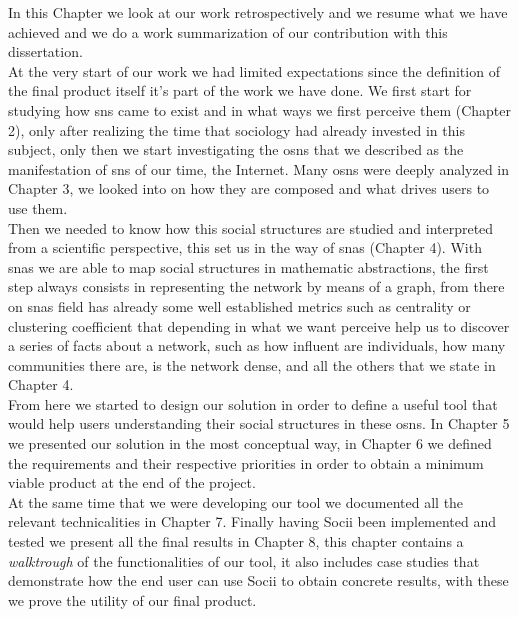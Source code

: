 In this Chapter we look at our work retrospectively and we resume what we have achieved and we do a work summarization of our contribution with this
dissertation.\\
\indent At the very start of our work we had limited expectations since the definition of the final product itself it's part of the work we have done. We first start for studying how \glspl{sn} came to exist and in what ways we first perceive them (Chapter 2), only after realizing the time that sociology had already invested in this subject, only then we start investigating the \glspl{osn} that we described as the manifestation of \glspl{sn} of our time, the Internet. Many \glspl{osn} were deeply analyzed in Chapter 3, we looked into on how they are composed and what drives users to use them.\\
\indent Then we needed to know how this social structures are studied and interpreted from a scientific perspective, this set us in the way of \glspl{sna} (Chapter 4). With \glspl{sna} we are able to map social structures in mathematic abstractions, the first step always consists in representing the network by means of a graph, from there on \glspl{sna} field has already some well established metrics such as centrality or clustering coefficient that depending in what we want perceive help us to discover a series of facts about a network, such as how influent are individuals, how many communities there are, is the network dense, and all the others that we state in Chapter 4.\\
\indent From here we started to design our solution in order to define a useful tool that would help users understanding their social structures in these \glspl{osn}. In Chapter 5 we presented our solution in the most conceptual way, in Chapter 6 we defined the requirements and their respective priorities in order to obtain a minimum viable product at the end of the project.\\
\indent At the same time that we were developing our tool we documented all the relevant technicalities in Chapter 7. Finally having Socii been implemented and tested we present all the final results in Chapter 8, this chapter contains a \textit{walktrough} of the functionalities of our tool, it also includes case studies that demonstrate how the end user can use Socii to obtain concrete results, with these we prove the utility of our final product.

